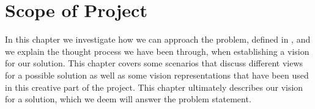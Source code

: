 
\chapter{Scope of Project}
\label{cha:scope_of_project}

In this chapter we investigate how we can approach the problem, defined in , and we explain the thought process we have been through, when establishing a vision for our solution. This chapter covers some scenarios that discuss different views for a possible solution as well as some vision representations that have been used in this creative part of the project. This chapter ultimately describes our vision for a solution, which we deem will answer the problem statement. 







